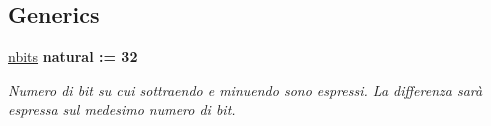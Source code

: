 \subsection*{Generics}
 \begin{DoxyCompactItemize}
\item 
\hyperlink{group___subtractor_gae1435c07d0cd54b521535e2f8de6f94e}{nbits} {\bfseries {\bfseries \textcolor{vhdlchar}{natural}\textcolor{vhdlchar}{ }\textcolor{vhdlchar}{ }\textcolor{vhdlchar}{\+:}\textcolor{vhdlchar}{=}\textcolor{vhdlchar}{ }\textcolor{vhdlchar}{ } \textcolor{vhdldigit}{32} \textcolor{vhdlchar}{ }}}
\begin{DoxyCompactList}\small\item\em Numero di bit su cui sottraendo e minuendo sono espressi. La differenza sarà espressa sul medesimo numero di bit. \end{DoxyCompactList}\end{DoxyCompactItemize}
